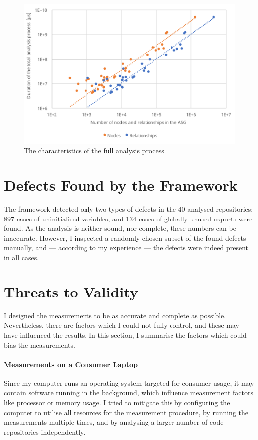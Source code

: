 \begin{figure}[!p]
	\centerfloat
	\includegraphics[width=\textwidth-1cm,clip]{figures/measurement-totaltime-nodes-relationships.pdf}
	\caption{The characteristics of the full analysis process}
	\label{fig:measurement-totaltime-nodes-relationships}
\end{figure}


\section{Defects Found by the Framework}

The framework detected only two types of defects in the 40 analysed repositories: 897 cases of uninitialised variables, and 134 cases of globally unused exports were found. As the analysis is neither sound, nor complete, these numbers can be inaccurate. However, I inspected a randomly chosen subset of the found defects manually, and — according to my experience — the defects were indeed present in all cases.


\section{Threats to Validity}

I designed the measurements to be as accurate and complete as possible. Nevertheless, there are factors which I could not fully control, and these may have influenced the results. In this section, I summarise the factors which could bias the measurements.


\paragraph{Measurements on a Consumer Laptop}
Since my computer runs an operating system targeted for consumer usage, it may contain software running in the background, which influence measurement factors like processor or memory usage. I tried to mitigate this by configuring the computer to utilise all resources for the measurement procedure, by running the measurements multiple times, and by analysing a larger number of code repositories independently.


